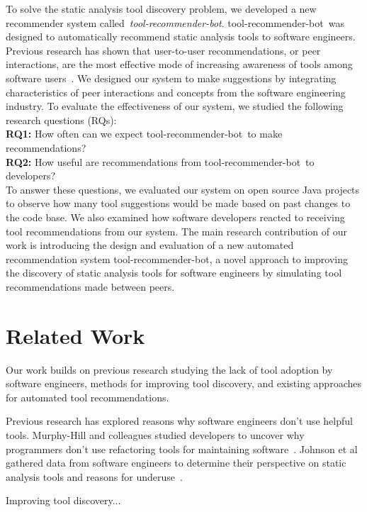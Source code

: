 \documentclass[conference]{IEEEtran}
\newcommand{\tool}{tool-recommender-bot}
\begin{document}
To solve the static analysis tool discovery problem, we developed a new recommender system called~\textit{\tool}. \tool~was designed to automatically recommend static analysis tools to software engineers. Previous research has shown that user-to-user recommendations, or peer interactions, are the most effective mode of increasing awareness of tools among software users~\cite{PeerInteraction}. We designed our system to make suggestions by integrating characteristics of peer interactions and concepts from the software engineering industry. To evaluate the effectiveness of our system, we studied the following research questions (RQs): \\

\noindent
\textbf{RQ1:} How often can we expect \tool~to make recommendations?  \\
\textbf{RQ2:} How useful are recommendations from \tool~to developers?  \\

To answer these questions, we evaluated our system on open source Java projects to observe how many tool suggestions would be made based on past changes to the code base. We also examined how software developers reacted to receiving tool recommendations from our system. The main research contribution of our work is introducing the design and evaluation of a new automated recommendation system \tool, a novel approach to improving the discovery of static analysis tools for software engineers by simulating tool recommendations made between peers.

\section{Related Work}

Our work builds on previous research studying the lack of tool adoption by software engineers, methods for improving tool discovery, and existing approaches for automated tool recommendations.

Previous research has explored reasons why software engineers don't use helpful tools. Murphy-Hill and colleagues studied developers to uncover why programmers don't use refactoring tools for maintaining software~\cite{MurphyHillWhyRefactoringTools}. Johnson et al gathered data from software engineers to determine their perspective on static analysis tools and reasons for underuse~\cite{JohnsonStaticAnalysis}.

Improving tool discovery...\\
\end{document}

